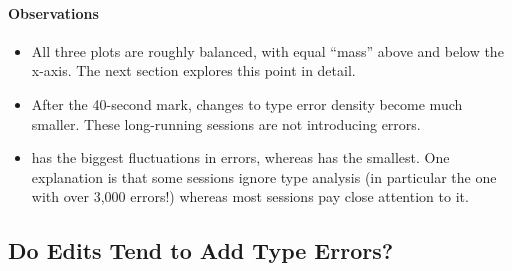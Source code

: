\documentclass[english,submission,cleveref]{programming}
\begin{document}
\paragraph{Observations}


\begin{itemize}
  \item
    All three plots are roughly balanced,
    with equal ``mass'' above and below the x-axis.
    The next section explores this point in detail.

  \item
    After the 40-second mark, changes to type error density become much
    smaller.
    These long-running sessions are not introducing errors.

  \item
    \mnonstrict{} has the biggest fluctuations in errors, whereas \mstrict{}
    has the smallest.
    One explanation is that some \mnonstrict{} sessions ignore type analysis
    (in particular the one with over 3,000 errors!) whereas most \mstrict{}
    sessions pay close attention to it.


\end{itemize}


\subsection{Do Edits Tend to Add Type Errors?}
\end{document}
